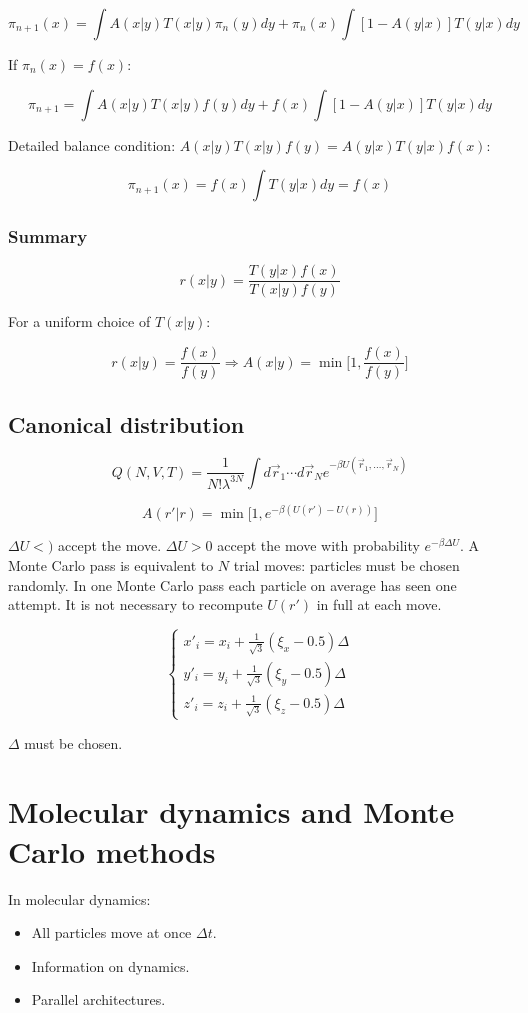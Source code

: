 	$$\pi_{n+1}(x) = \int A(x|y)T(x|y)\pi_n(y)dy + \pi_n(x)\int[1-A(y|x)]T(y|x)dy$$

	If $\pi_n(x) = f(x)$:

	$$\pi_{n+1} = \int A(x|y)T(x|y)f(y)dy + f(x)\int[1-A(y|x)]T(y|x)dy$$

	Detailed balance condition: $A(x|y)T(x|y)f(y) = A(y|x)T(y|x)f(x)$:

	$$\pi_{n+1}(x) = f(x)\int T(y|x)dy = f(x)$$

		\subsubsection{Summary}

		$$r(x|y) = \frac{T(y|x)f(x)}{T(x|y)f(y)}$$

		For a uniform choice of $T(x|y)$:

		$$r(x|y) = \frac{f(x)}{f(y)}\Rightarrow A(x|y) = \min\biggl[1, \frac{f(x)}{f(y)}\biggr]$$

	\subsection{Canonical distribution}

	$$Q(N, V, T) = \frac{1}{N!\lambda^{3N}}\int d\vec{r}_1\cdots d\vec{r}_Ne^{-\beta U(\vec{r}_1, \dots, \vec{r}_N)}$$

	$$A(r'|r) = \min\bigl[1, e^{-\beta(U(r')-U(r))}\bigr]$$

	$\Delta U < )$ accept the move.
	$\Delta U > 0$ accept the move with probability $e^{-\beta\Delta U}$.
	A Monte Carlo pass is equivalent to $N$ trial moves: particles must be chosen randomly.
	In one Monte Carlo pass each particle on average has seen one attempt.
	It is not necessary to recompute $U(r')$ in full at each move.

	$$\begin{cases}x'_i = x_i+\frac{1}{\sqrt{3}}(\xi_x-0.5)\Delta\\y'_i = y_i+\frac{1}{\sqrt{3}}(\xi_y-0.5)\Delta\\z'_i = z_i+\frac{1}{\sqrt{3}}(\xi_z-0.5)\Delta\end{cases}$$

	$\Delta$ must be chosen.

\section{Molecular dynamics and Monte Carlo methods}
In molecular dynamics:

\begin{multicols}{2}
	\begin{itemize}
		\item All particles move at once $\Delta t$.
		\item Information on dynamics.
		\item Parallel architectures.
	\end{itemize}
\end{multicols}

